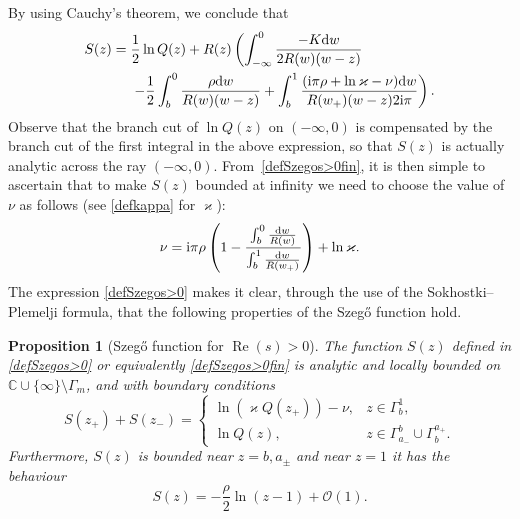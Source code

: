 \documentclass[pdftex]{sigma}
\numberwithin{equation}{section}
\newtheorem{Proposition}[Theorem]{Proposition}
\theoremstyle{definition}
\def\le{\left}
\def\ri{\right}
\def \d{{\mathrm d}}
\def\be{\begin{equation}}
\def\ee{\end{equation}}
\def\C{{\mathbb C}}
\def \Re{\operatorname{Re} }
\begin{document}
By using Cauchy's theorem, we conclude that
\begin{align}
S(z)
={}&\frac 1 2\ln Q(z)+ R(z) \left( \int_{-\infty}^0 \frac { -{K}\d w}{2R(w)(w-z)}\right. \nonumber\\
&\left.-\frac 1 2 \int_b^0 \frac {{ {\rho}} \d w}{R(w)(w-z)}
+\int_b^1 \frac {({\rm i}\pi { {\rho}} + \ln \varkappa -\nu) \d w}{R(w_+)(w-z)2{\rm i}\pi}
\right).
\label{defSzegos>0fin}
\end{align}
Observe that the branch cut of $\ln Q(z)$ on $(-\infty,0)$ is compensated by the branch cut of the first integral in the above expression, so that $S(z)$ is actually analytic across the ray $(-\infty,0)$.
From~\eqref{defSzegos>0fin}, it is then simple to ascertain that to make $S(z)$ bounded at infinity we need to choose the value of $\nu$ as follows (see \eqref{defkappa} for $\varkappa$):
\be
\label{defnus>0}
\nu = {\rm i}\pi { {\rho}}\le(1- \frac {\int_b^0 \frac {\d w}{R(w)}}{\int_{b}^1 \frac {\d w}{R(w_+)}} \ri) + \ln \varkappa.
\ee
The expression \eqref{defSzegos>0} makes it clear, through the use of the Sokhostki--Plemelji formula, that the following properties of the Szeg\H{o} function hold.

\begin{Proposition}[Szeg\H{o} function for $\Re(s)>0$]
\label{propSzegos>0}
The function $S(z)$ defined in \eqref{defSzegos>0} or equivalently \eqref{defSzegos>0fin} is analytic and locally bounded on $\C\cup \{\infty\}\setminus \Gamma_m$, and with boundary conditions
\[
S(z_+)+ S(z_-) =
\begin{cases}
\ln \le(\varkappa Q(z_+)\ri) - \nu, & z\in \Gamma_b^1,\\
\ln Q(z), & z\in \Gamma_{a_-}^b \cup \Gamma_b^{a_+}.
\end{cases}
\]
Furthermore, $S(z)$ is bounded near $z=b,a_\pm$ and near $z=1$ it has the behaviour {\rm\cite[\emph{Chapter}~5]{Gakhov}}
\[
S(z) = -\frac { {\rho}} 2\ln(z-1) + \mathcal O(1).
\]
\end{Proposition}
\end{document}

